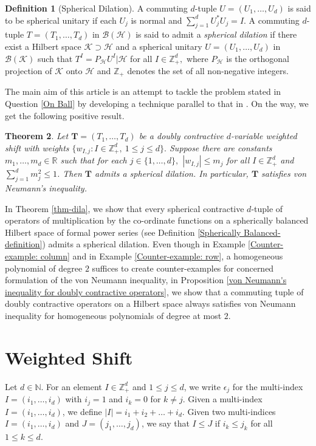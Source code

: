 \documentclass[12pt,reqno] {amsart}
\newtheorem{theorem}{Theorem}
\theoremstyle{remark}
\theoremstyle{definition}
\newtheorem{definition}[theorem]{Definition}%
\begin{document}
\begin{definition}[Spherical Dilation]
    A commuting $d$-tuple $U=(U_1, \ldots, U_d)$ is said to be spherical unitary if each $U_j$ is normal and $\sum_{j=1}^d U^*_jU_j = I.$ A commuting $d$-tuple $T=(T_1, \ldots, T_d)$ in $\mathcal B(\mathcal H)$ is said to admit a {\it spherical dilation} if there exist a Hilbert space $\mathcal K \supset \mathcal H$ and a  spherical unitary $U=(U_1, \ldots, U_d)$ in $\mathcal B(\mathcal K)$
 such that $T^I=P_{\mathcal H}U^I|\mathcal H$ for all $I \in \mathbb Z_{+}^d,$ where $P_{\mathcal H}$ is the orthogonal projection of $\mathcal K$ onto $\mathcal H$ and $\mathbb Z_+$ denotes the set of all non-negative integers. 
\end{definition}


The main aim of this article is an attempt to tackle the problem stated in Question \ref{On Ball} by developing a technique parallel to that in \cite{Hz}. On the way, we get the following positive result.

\begin{theorem}\label{Main Theorem}
Let $\boldsymbol T = (T_1, \ldots, T_d)$ be a doubly contractive $d$-variable weighted shift with weights $\{w_{I,j}: I\in \mathbb Z_+^d,\ 1\leq j\leq d \}.$ Suppose there are constants $m_1,\ldots,m_d\in \mathbb R$ such that for each $j\in \{1,\dots ,d\},$ $|w_{I,j}|\leqslant m_j$ for all $I\in\mathbb Z_+^d$ and \(\sum_{j=1}^d m_j^2 \leqslant 1\). Then $\boldsymbol T$ admits a spherical dilation. In particular, $\boldsymbol T$ satisfies von Neumann’s inequality.
\end{theorem}
In Theorem \ref{thm-dila}, we show that every spherical contractive $d$-tuple of operators of multiplication by the co-ordinate functions on a spherically balanced Hilbert space of formal power series (see Definition \ref{Spherically Balanced- definition}) admits a spherical dilation. Even though in Example \ref{Counter-example: column} and in Example \ref{Counter-example: row}, a homogeneous polynomial of degree $2$ suffices to create counter-examples for concerned formulation of the von Neumann inequality, in Proposition \ref{von Neumann's inequality for doubly contractive operators}, we show that a commuting tuple of doubly contractive operators on a Hilbert space always satisfies von Neumann inequality for homogeneous polynomials of degree at most $2.$  

\section{Weighted Shift}
Let \( d \in \mathbb{N} \).  For an element \( I \in \mathbb{Z}_+^d \) and \( 1 \leq j \leq d \), we write \( \epsilon_j \) for the multi-index \( I = (i_1, \dots, i_d) \) with \( i_j = 1 \) and \( i_k = 0 \) for \( k \neq j \). Given a multi-index \( I = (i_1, \dots, i_d) \), we define \( |I| = i_1 + i_2 + \dots + i_d \). 
Given two multi-indices \( I = (i_1, \dots, i_d) \) and \( J = (j_1, \dots, j_d) \), we say that \( I \leq J \) if \( i_k \leq j_k \) for all \( 1 \leq k \leq d \). 
\end{document}
